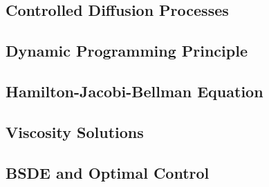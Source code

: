 \subsection{Controlled Diffusion Processes}


\subsection{Dynamic Programming Principle}
\subsection{Hamilton-Jacobi-Bellman Equation}

\subsection{Viscosity Solutions}

\subsection{BSDE and Optimal Control}